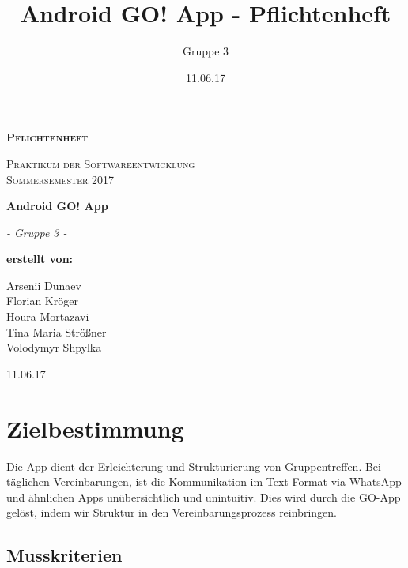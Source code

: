 \documentclass[parskip=full]{scrartcl}
\title{Android GO! App - Pflichtenheft}
\author{Gruppe 3}
\date{11.06.17}
\begin{document}
\begin{titlepage}
	\begin{center}
	{\scshape\LARGE \bfseries Pflichtenheft \par}
	\vspace{1cm}
	{\scshape\Large Praktikum der Softwareentwicklung \\ Sommersemester 2017\par}
	\vspace{1.5cm}
	{\huge\bfseries Android GO! App\par}
	\vspace{2cm}
	{\Large\itshape - Gruppe 3 -\par}
	\vfill
	{\bfseries erstellt von:\par}
	Arsenii Dunaev \\
	Florian Kröger \\
	Houra Mortazavi \\ %
	Tina Maria Strößner \\
	Volodymyr Shpylka \\	
	\vfill
	{\large 11.06.17 \par}	
	\end{center}
\end{titlepage}

\tableofcontents

\newpage
\section{Zielbestimmung}
Die \gls{App} dient der Erleichterung und Strukturierung von Gruppentreffen. 
 Bei täglichen Vereinbarungen, ist die Kommunikation im Text-Format via WhatsApp und ähnlichen Apps unübersichtlich und unintuitiv. 
Dies wird durch die GO-App gelöst, indem wir Struktur in den Vereinbarungsprozess reinbringen.  
\subsection{Musskriterien}
\end{document}

